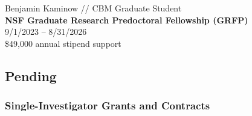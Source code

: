 \documentclass[10pt]{article}
\begin{document}
\vspace{1.5ex}

Benjamin Kaminow // CBM Graduate Student \\
{\bf NSF Graduate Research Predoctoral Fellowship (GRFP)}\\
9/1/2023 -- 8/31/2026\\
\$49,000 annual stipend support


\eject
\subsection*{Pending}

\subsubsection*{Single-Investigator Grants and Contracts}

%




\end{document}
